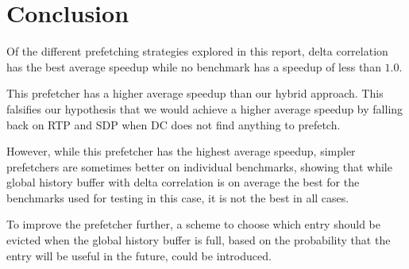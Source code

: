\section{Conclusion}
\label{sec:conclusion}

Of the different prefetching strategies explored in this report, delta
correlation has the best average speedup while no benchmark has a
speedup of less than $1.0$.

This prefetcher has a higher average speedup than our hybrid
approach. This falsifies our hypothesis that we would achieve
a higher average speedup by falling back on RTP and SDP when
DC does not find anything to prefetch.

However, while this prefetcher has the highest average
speedup, simpler prefetchers are sometimes better on
individual benchmarks, showing that while global history buffer
with delta correlation is on average the best for the benchmarks
used for testing in this case, it is not the best in all cases.

To improve the prefetcher further, a scheme to choose which
entry should be evicted when the global history buffer is full,
based on the probability that the entry will be useful in the
future, could be introduced.


